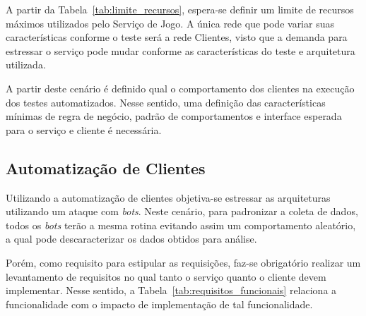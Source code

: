 A partir da Tabela~\ref{tab:limite_recursos}, espera-se definir um limite de recursos máximos utilizados pelo Serviço de Jogo.
%
A única rede que pode variar suas características conforme o teste será a rede Clientes, visto que a demanda para estressar o serviço pode mudar conforme as características do teste e arquitetura utilizada.

A partir deste cenário é definido qual o comportamento dos clientes na execução dos testes automatizados.
%
Nesse sentido, uma definição das características mínimas de regra de negócio, padrão de comportamentos e interface esperada para o serviço e cliente é necessária.



\subsection{Automatização de Clientes}
\label{sec:SimulaCliente}



Utilizando a automatização de clientes objetiva-se estressar as arquiteturas utilizando um ataque com \textit{bots}.
%
Neste cenário, para padronizar a coleta de dados, todos os \textit{bots} terão a mesma rotina evitando assim um comportamento aleatório, a qual pode descaracterizar os dados obtidos para análise.



Porém, como requisito para estipular as requisições, faz-se obrigatório realizar um levantamento de requisitos no qual tanto o serviço quanto o cliente devem implementar.
%
Nesse sentido, a Tabela~\ref{tab:requisitos_funcionais} relaciona a funcionalidade com o impacto de implementação de tal funcionalidade.




